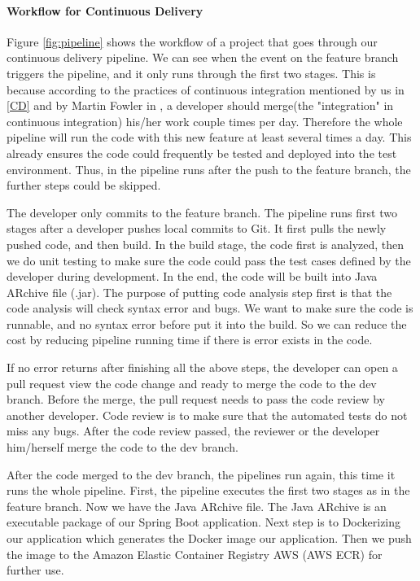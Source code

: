 \paragraph[]{Workflow for Continuous Delivery}
Figure \ref{fig:pipeline} shows the workflow of a project that goes through our continuous delivery pipeline.
We can see when the event on the feature branch triggers the pipeline, and it only runs through the first two stages. This is because according to the practices of continuous integration mentioned by us in \ref{CD} and by Martin Fowler in \cite{fowler2006continuous}, a developer should merge(the "integration" in continuous integration) his/her work couple times per day. Therefore the whole pipeline will run the code with this new feature at least several times a day. This already ensures the code could frequently be tested and deployed into the test environment. Thus, in the pipeline runs after the push to the feature branch, the further steps could be skipped. 
\par
 The developer only commits to the feature branch. The pipeline runs first two stages after a developer pushes local commits to Git. It first pulls the newly pushed code, and then build. In the build stage, the code first is analyzed, then we do unit testing to make sure the code could pass the test cases defined by the developer during development. In the end, the code will be built into Java ARchive file (.jar). The purpose of putting code analysis step first is that the code analysis will check syntax error and bugs. We want to make sure the code is runnable, and no syntax error before put it into the build. So we can reduce the cost by reducing pipeline running time if there is error exists in the code. 
\par
If no error returns after finishing all the above steps, the developer can open a pull request view the code change and ready to merge the code to the dev branch. Before the merge, the pull request needs to pass the code review by another developer. Code review is to make sure that the automated tests do not miss any bugs. After the code review passed, the reviewer or the developer him/herself merge the code to the dev branch.  
\par
After the code merged to the dev branch, the pipelines run again, this time it runs the whole pipeline. First, the pipeline executes the first two stages as in the feature branch. Now we have the Java ARchive file. The Java ARchive is an executable package of our Spring Boot application. Next step is to Dockerizing our application which generates the Docker image our application. Then we push the image to the Amazon Elastic Container Registry AWS (AWS ECR) for further use.
